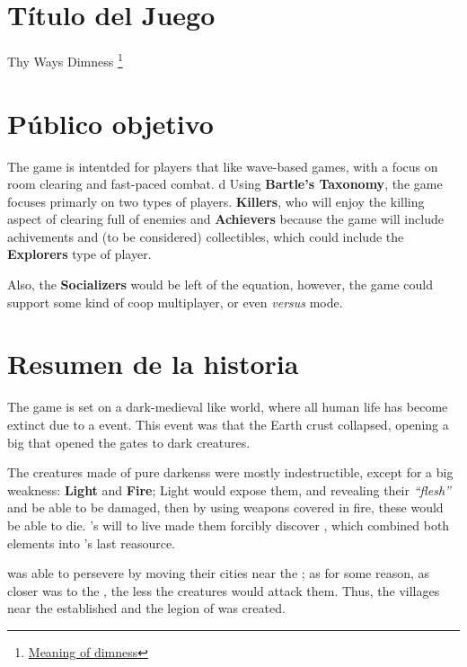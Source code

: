 \begin{multicols}{2}


\section{Título del Juego}
Thy Ways Dimness \footnote{\href{https://dictionary.cambridge.org/es/diccionario/ingles/dimness}{Meaning of dimness}}


\section{Público objetivo}
The game is intentded for players that like wave-based games, with a focus on room clearing and fast-paced combat.
d
Using \textbf{Bartle's Taxonomy}, the game focuses primarly on two types of players. \textbf{Killers}, who will enjoy the killing aspect of clearing full of enemies and \textbf{Achievers} because the game will include achivements and (to be considered) collectibles, which could include the \textbf{Explorers} type of player.

Also, the \textbf{Socializers} would be left of the equation, however, the game could support some kind of coop multiplayer, or even \textit{versus} mode.



\section{Resumen de la historia}
The game is set on a dark-medieval like world, where all human life has become extinct due to a event. This event was that the Earth crust collapsed, opening a big \hole that opened the gates to dark creatures.

The creatures made of pure darkenss were mostly indestructible, except for a big weakness: \textbf{Light} and \textbf{Fire}; Light would expose them, and revealing their \textit{“flesh”} and be able to be damaged, then by using weapons covered in fire, these would be able to die. \humanity's will to live made them forcibly discover \gunpowder, which combined both elements into \humanity's last reasource.

\humanity was able to persevere by moving their cities near the \hole; as for some reason, as closer \humanity was to the \hole, the less the creatures would attack them. Thus, the villages near the \hole established and the legion of \hunters was created.


\end{multicols}
